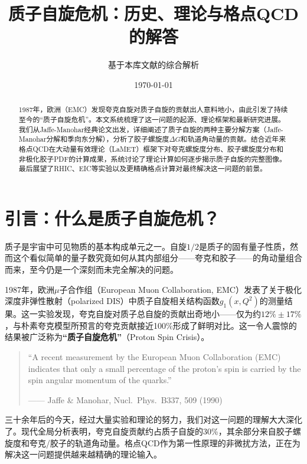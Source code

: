 \documentclass[12pt,a4paper]{ctexart}
\title{\heiti 质子自旋危机：历史、理论与格点QCD的解答}
\author{基于本库文献的综合解析}
\date{\today}
\theoremstyle{definition}
\begin{document}
\maketitle

\begin{abstract}
\noindent
1987年，欧洲（EMC）发现夸克自旋对质子自旋的贡献出人意料地小，由此引发了持续至今的``质子自旋危机''。本文系统梳理了这一问题的起源、理论框架和最新研究进展。我们从Jaffe-Manohar经典论文出发，详细阐述了质子自旋的两种主要分解方案（Jaffe-Manohar分解和季向东分解），分析了胶子螺旋度$\Delta G$和轨道角动量的贡献。结合近年来格点QCD在大动量有效理论（LaMET）框架下对夸克螺旋度分布、胶子螺旋度分布和非极化胶子PDF的计算成果，系统讨论了理论计算如何逐步揭示质子自旋的完整图像。最后展望了RHIC、EIC等实验以及更精确格点计算对最终解决这一问题的前景。
\end{abstract}

\tableofcontents
\newpage

\section{引言：什么是质子自旋危机？}

质子是宇宙中可见物质的基本构成单元之一。自旋$1/2$是质子的固有量子性质，然而这个看似简单的量子数究竟如何从其内部组分——夸克和胶子——的角动量组合而来，至今仍是一个深刻而未完全解决的问题。

1987年，欧洲$\mu$子合作组（European Muon Collaboration, EMC）发表了关于极化深度非弹性散射（polarized DIS）中质子自旋相关结构函数$g_1(x,Q^2)$的测量结果\cite{EMC}。这一实验发现，夸克自旋对质子总自旋的贡献出奇地小——仅为约$12\% \pm 17\%$，与朴素夸克模型所预言的夸克贡献接近100\%形成了鲜明对比。这一令人震惊的结果被广泛称为\textbf{``质子自旋危机''}（Proton Spin Crisis）。

\begin{quote}
\small
``A recent measurement by the European Muon Collaboration (EMC) indicates that only a small percentage of the proton's spin is carried by the spin angular momentum of the quarks.''
\begin{flushright}
—— Jaffe \& Manohar, Nucl.\ Phys.\ B337, 509 (1990) \cite{JaffeManohar1990}
\end{flushright}
\end{quote}

三十余年后的今天，经过大量实验和理论的努力，我们对这一问题的理解大大深化了。现代全局分析表明，夸克自旋贡献约占质子自旋的30\%\cite{DSSV14,NNPDFpol11,JAM17}，其余部分来自胶子螺旋度和夸克/胶子的轨道角动量。格点QCD作为第一性原理的非微扰方法，正在为解决这一问题提供越来越精确的理论输入\cite{Egerer2022,LP3helicity,Lin2025gluon}。
\end{document}

